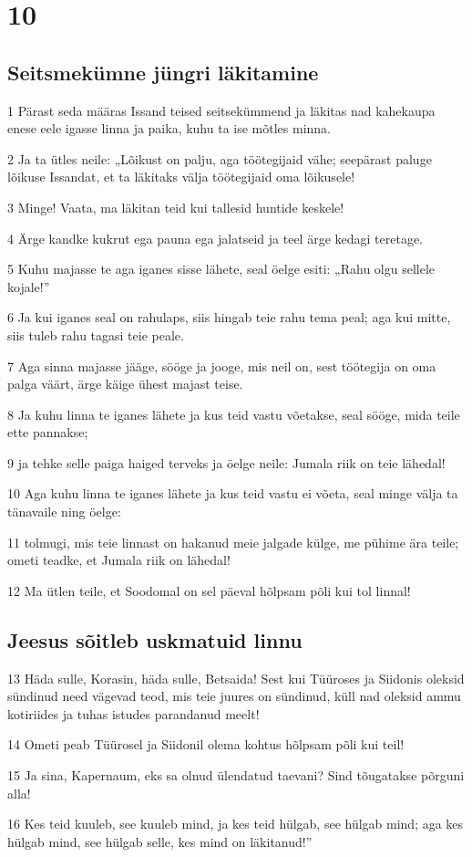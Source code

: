 \chapter{10}

\section*{Seitsmekümne jüngri läkitamine}

\par 1 Pärast seda määras Issand teised seitsekümmend ja läkitas nad kahekaupa enese eele igasse linna ja paika, kuhu ta ise mõtles minna.
\par 2 Ja ta ütles neile: „Lõikust on palju, aga töötegijaid vähe; seepärast paluge lõikuse Issandat, et ta läkitaks välja töötegijaid oma lõikusele!
\par 3 Minge! Vaata, ma läkitan teid kui tallesid huntide keskele!
\par 4 Ärge kandke kukrut ega pauna ega jalatseid ja teel ärge kedagi teretage.
\par 5 Kuhu majasse te aga iganes sisse lähete, seal öelge esiti: „Rahu olgu sellele kojale!”
\par 6 Ja kui iganes seal on rahulaps, siis hingab teie rahu tema peal; aga kui mitte, siis tuleb rahu tagasi teie peale.
\par 7 Aga sinna majasse jääge, sööge ja jooge, mis neil on, sest töötegija on oma palga väärt, ärge käige ühest majast teise.
\par 8 Ja kuhu linna te iganes lähete ja kus teid vastu võetakse, seal sööge, mida teile ette pannakse;
\par 9 ja tehke selle paiga haiged terveks ja öelge neile: Jumala riik on teie lähedal!
\par 10 Aga kuhu linna te iganes lähete ja kus teid vastu ei võeta, seal minge välja ta tänavaile ning öelge:
\par 11 tolmugi, mis teie linnast on hakanud meie jalgade külge, me pühime ära teile; ometi teadke, et Jumala riik on lähedal!
\par 12 Ma ütlen teile, et Soodomal on sel päeval hõlpsam põli kui tol linnal!

\section*{Jeesus sõitleb uskmatuid linnu}

\par 13 Häda sulle, Korasin, häda sulle, Betsaida! Sest kui Tüüroses ja Siidonis oleksid sündinud need vägevad teod, mis teie juures on sündinud, küll nad oleksid ammu kotiriides ja tuhas istudes parandanud meelt!
\par 14 Ometi peab Tüürosel ja Siidonil olema kohtus hõlpsam põli kui teil!
\par 15 Ja sina, Kapernaum, eks sa olnud ülendatud taevani? Sind tõugatakse põrguni alla!
\par 16 Kes teid kuuleb, see kuuleb mind, ja kes teid hülgab, see hülgab mind; aga kes hülgab mind, see hülgab selle, kes mind on läkitanud!”

